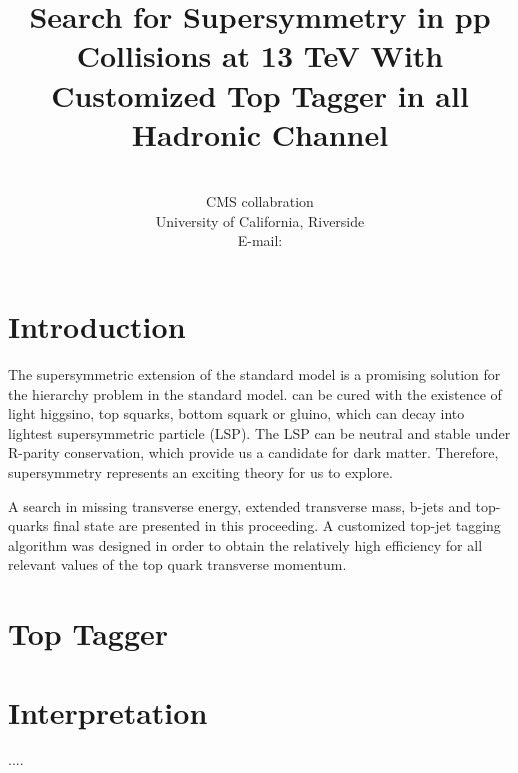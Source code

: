 \documentclass{PoS}
\title{Search for Supersymmetry in pp Collisions at 13 TeV With Customized Top Tagger in all Hadronic Channel}
\author
{
  \speaker{Hua Wei}\\
  CMS collabration\\
  University of California, Riverside\\
  E-mail: \email{hua.wei@cern.ch}
}
\begin{document}
\section{Introduction}

The supersymmetric extension of the standard model is a promising solution for the hierarchy problem in the standard model. can be cured with the existence of light higgsino, top squarks, bottom squark or gluino, which can decay into lightest supersymmetric particle (LSP). The LSP can be neutral and stable under R-parity conservation, which provide us a candidate for dark matter. Therefore, supersymmetry represents an exciting theory for us to explore.

A search in missing transverse energy, extended transverse mass, b-jets and top-quarks final state are presented in this proceeding. A customized top-jet tagging algorithm was designed in order to obtain the relatively high efficiency for all relevant values of the top quark transverse momentum.

\section{Top Tagger}
\section{Interpretation}

\begin{thebibliography}{99}
....

\end{thebibliography}
\end{document}
